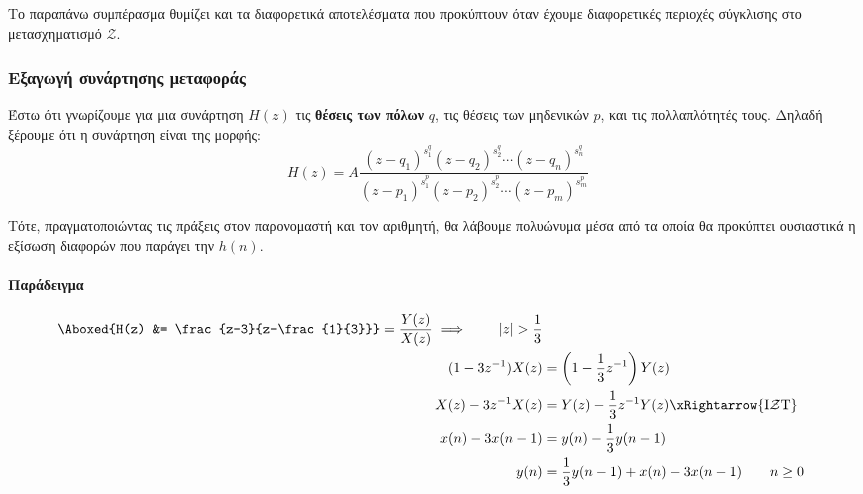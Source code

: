 \documentclass[11pt,a4paper,notitlepage,fleqn]{article}
\begin{document}
Το παραπάνω συμπέρασμα θυμίζει και τα διαφορετικά αποτελέσματα που προκύπτουν όταν έχουμε διαφορετικές περιοχές
σύγκλισης στο μετασχηματισμό \( \mathcal{Z} \).

\subsubsection{Εξαγωγή συνάρτησης μεταφοράς}
Έστω ότι γνωρίζουμε για μια συνάρτηση \( H(z) \) τις \textbf{θέσεις των πόλων } \( q \), τις θέσεις των
μηδενικών \( p \), και τις πολλαπλότητές τους. Δηλαδή ξέρουμε ότι η συνάρτηση είναι της μορφής:
\[
H(z) = A
\frac{(z-q_1)^{s_1^q}(z-q_2)^{s_2^q} \cdots (z-q_n)^{s_n^q} }{(z-p_1)^{s_1^p}(z-p_2)^{s_2^p} \cdots (z-p_m)^{s_m^p}}
\]

Τότε, πραγματοποιώντας τις πράξεις στον παρονομαστή και τον αριθμητή, θα λάβουμε πολυώνυμα μέσα από
τα οποία θα προκύπτει ουσιαστικά η εξίσωση διαφορών που παράγει την \( h(n) \).

\paragraph{Παράδειγμα}
\begin{align*}
	\Aboxed{H(z) &= \frac{z-3}{z-\frac{1}{3}}} = \frac{Y(z)}{X(z)} \implies \qquad |z|>\frac{1}{3}
	\\ (1-3z^{-1})X(z) &= \left(1-\frac{1}{3}z^{-1}\right)Y(z)\\
	X(z) - 3z^{-1}X(z) &= Y(z)-\frac{1}{3}z^{-1} Y(z) \xRightarrow{\text{I}\mathcal{Z}\text{T}} \\
	x(n) - 3x(n-1) &= y(n) - \frac{1}{3}y(n-1) \\
	y(n) &= \frac{1}{3}y(n-1) + x(n) -3x(n-1) \qquad n\geq 0
\end{align*}
\end{document}
